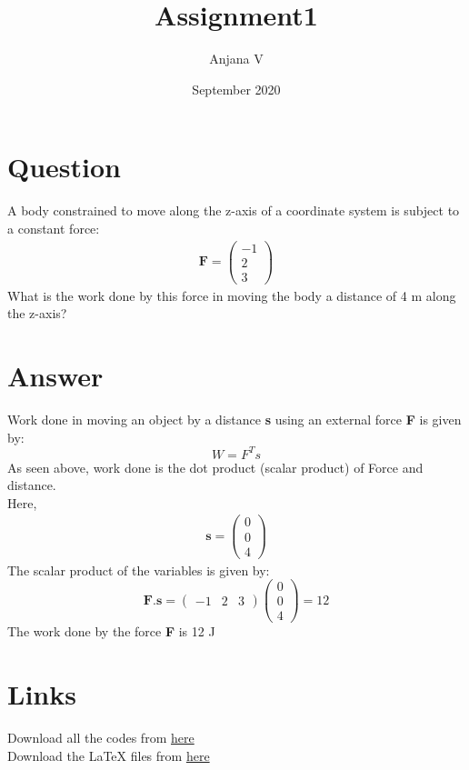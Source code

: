 \documentclass{article}
\title{Assignment1}
\author{Anjana V }
\date{September 2020}
\begin{document}
\maketitle
\section*{Question}
A body constrained to move along the z-axis of a coordinate system is subject to a constant force:
\begin{align*}
\textbf{F}=\begin{pmatrix}
-1\\
2\\
3
\end{pmatrix}    
\end{align*}
What is the work done by this force in moving the body a distance of 4 m along the z-axis?
\section*{Answer}
Work done in moving an object by a distance \textbf{s} using an external force \textbf{F} is given by:
$$W = \textbf{$F^Ts$}$$
As seen above, work done is the dot product (scalar product) of Force and distance.
\\Here, 
\begin{align*}
\textbf{s}=\begin{pmatrix}
0\\
0\\
4
\end{pmatrix}    
\end{align*}
The scalar product of the variables is given by:
$$\textbf{F}.\textbf{s} = \begin{pmatrix}
-1 & 2 & 3
\end{pmatrix}\begin{pmatrix}
0\\
0\\
4
\end{pmatrix}=12$$
The work done by the force \textbf{F} is 12 J
\section*{Links}
Download all the codes from \href{https://github.com/anjanavasudevan/grad_schoolwork/blob/master/EE5609/Assignment1/assignment.py}{here} 
\\Download the LaTeX files from \href{https://github.com/anjanavasudevan/grad_schoolwork/tree/master/EE5609/Assignment1/latex}{here}
\end{document}
